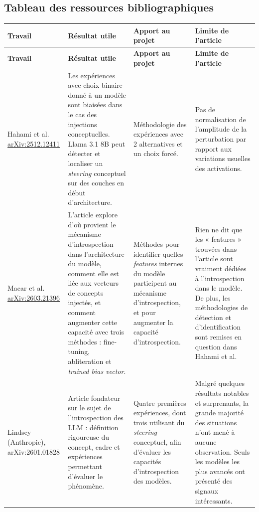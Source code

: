 \documentclass[10pt,a4paper]{article}
\begin{document}
\clearpage
\begin{landscape}
\section*{Tableau des ressources bibliographiques}
\scriptsize
\setlength{\tabcolsep}{3pt}
\renewcommand{\arraystretch}{1.05}
\begin{longtable}{@{}L{4.5cm} L{7.2cm} L{6.3cm} L{6.3cm}@{}}
\textbf{Travail} & \textbf{Résultat utile} & \textbf{Apport au projet} & \textbf{Limite de l'article}\\
\midrule
\endfirsthead
\textbf{Travail} & \textbf{Résultat utile} & \textbf{Apport au projet} & \textbf{Limite de l'article}\\
\midrule
\endhead
\bottomrule
\endfoot

Hahami et al. \cite{hahami2026}
  \newline \href{https://arxiv.org/abs/2512.12411}{arXiv:2512.12411}
& Les expériences avec choix binaire donné à un modèle sont biaisées dans le cas des injections conceptuelles. Llama 3.1 8B peut détecter et localiser un \emph{steering} conceptuel sur des couches en début d'architecture.
& Méthodologie des expériences avec 2 alternatives et un choix forcé.
& Pas de normalisation de l'amplitude de la perturbation par rapport aux variations usuelles des activations.
\\
\midrule

Macar et al. \cite{macar2026}
  \newline \href{https://arxiv.org/abs/2603.21396}{arXiv:2603.21396}
& L'article explore d'où provient le mécanisme d'introspection dans l'architecture du modèle, comment elle est liée aux vecteurs de concepts injectés, et comment augmenter cette capacité avec trois méthodes : fine-tuning, abliteration et \emph{trained bias vector}.
& Méthodes pour identifier quelles \emph{features} internes du modèle participent au mécanisme d'introspection, et pour augmenter la capacité d'introspection.
& Rien ne dit que les « features » trouvées dans l'article sont vraiment dédiées à l'introspection dans le modèle. De plus, les méthodologies de détection et d'identification sont remises en question dans Hahami et al.
\\
\midrule

Lindsey \cite{lindsey2026}
  \newline (Anthropic), arXiv:2601.01828
& Article fondateur sur le sujet de l'introspection des LLM : définition rigoureuse du concept, cadre et expériences permettant d'évaluer le phénomène.
& Quatre premières expériences, dont trois utilisant du \emph{steering} conceptuel, afin d'évaluer les capacités d'introspection des modèles.
& Malgré quelques résultats notables et surprenants, la grande majorité des situations n'ont mené à aucune observation. Seuls les modèles les plus avancés ont présenté des signaux intéressants.
\\
\midrule


\end{longtable}
\end{landscape}
\end{document}
